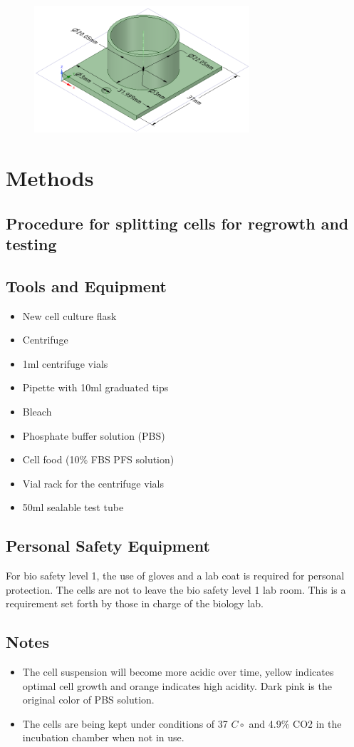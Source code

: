 \documentclass[journal]{IEEEtran}
\begin{document}
\begin{figure}[h]
\label{test-fixture}
\includegraphics[width=8cm]{Beaker.png}
\end{figure}

\section{Methods}

\subsection{Procedure for splitting cells for regrowth and testing}
\subsection{Tools and Equipment}
\begin{itemize}
\item New cell culture flask
\item Centrifuge
\item 1ml centrifuge vials 
\item Pipette with 10ml graduated tips
\item Bleach
\item Phosphate buffer solution (PBS)
\item Cell food (10\% FBS PFS solution)
\item Vial rack for the centrifuge vials
\item 50ml sealable test tube
\end{itemize}

\subsection{Personal Safety Equipment}
For bio safety level 1, the use of gloves and a lab coat is required for personal protection. The cells are not to leave the bio safety level 1 lab room. This is a requirement set forth by those in charge of the biology lab.

\subsection{Notes}
\begin{itemize}
\item The cell suspension will become more acidic over time, yellow indicates optimal cell growth and orange indicates high acidity. Dark pink is the original color of PBS solution.
\item The cells are being kept under conditions of 37 $C\circ$ and 4.9\% CO2 in the incubation chamber when not in use. 
\end{itemize}
\end{document}
